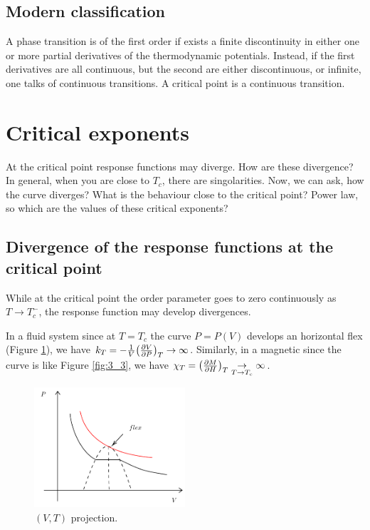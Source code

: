 \documentclass[../main/main.tex]{subfiles}
\begin{document}
\subsection{Modern classification}
A phase transition is of the first order if exists a finite discontinuity in either one or more partial derivatives of the thermodynamic potentials. Instead, if the first derivatives are all continuous, but the second are either discontinuous, or infinite, one talks of continuous transitions.
A critical point is a continuous transition.




\section{Critical exponents}

At the critical point response functions may diverge. How are these divergence?
In general, when you are close to \( T_c \), there are singolarities. Now, we can ask, how the curve diverges? What is the behaviour close to the critical point? Power law, so which are the values of these critical exponents?

\subsection{Divergence of the response functions at the critical point}
\label{sec:3_1}
While at the critical point the order parameter goes to zero continuously as \( T \rightarrow T_c^- \), the response function may develop divergences.
\begin{example}{}{}
In a fluid system since at \( T=T_c \) the curve \( P = P(V) \) develops an horizontal flex (Figure \ref{fig:3_2_2}), we have \( k_T = -\frac{1}{V} \qty(\pdv{V}{P} )_T  \rightarrow \infty  \). Similarly, in a magnetic since the curve is like Figure \ref{fig:3_3}, we have \( \chi _T = \qty(\pdv{M}{H} )_T \underset{T \rightarrow  T_c}{\rightarrow } \infty   \).

\end{example}

\begin{figure}[h!]
\centering
\includegraphics[width=0.5\textwidth]{../lessons/3_image/4.pdf}
\caption{\label{fig:3_2_2} \( (V,T) \) projection.  }
\end{figure}
\end{document}
